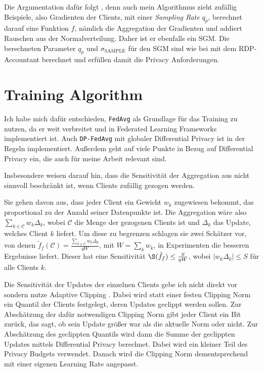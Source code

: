 Die Argumentation dafür folgt \textcite{boenisch:2023}, denn auch mein Algorithmus zieht zufällig Beispiele, also Gradienten der Clients, mit einer \textit{Sampling Rate} $q_p$, berechnet darauf eine Funktion $f$, nämlich die Aggregation der Gradienten und addiert Rauschen aus der Normalverteilung. Daher ist er ebenfalls ein SGM. Die berechneten Parameter $q_p$ und $\sigma_{\text{SAMPLE}}$ für den SGM sind wie bei \citeauthor{boenisch:2023} mit dem RDP-Accountant berechnet und erfüllen damit die Privacy Anforderungen.

\section{Training Algorithm}
Ich habe mich dafür entschieden, \texttt{FedAvg} als Grundlage für das Training zu nutzen, da er weit verbreitet und in Federated Learning Frameworks implementiert ist. Auch \texttt{DP-FedAvg} mit globaler Differential Privacy \cite{mcmahan:2018} ist in der Regeln implementiert. Außerdem geht \textcite{mcmahan:2018} auf viele Punkte in Bezug auf Differential Privacy ein, die auch für meine Arbeit relevant sind. 

Insbesondere weisen \citeauthor{mcmahan:2018} darauf hin, dass die Sensitivität der Aggregation aus nicht sinnvoll beschränkt ist, wenn Clients zufällig gezogen werden. 

Sie gehen davon aus, dass jeder Client ein Gewicht $w_k$ zugewiesen bekommt, das proportional zu der Anzahl seiner Datenpunkte ist. Die Aggregation wäre also $\sum_{k \in \mathcal{C}} w_k \Delta_k$, wobei $\mathcal{C}$ die Menge der gezogenen Clients ist und $\Delta_k$ das Update, welches Client $k$ liefert. Um diese zu begrenzen schlagen sie zwei Schätzer vor, von denen $\tilde{f}_f(\mathcal{C}) = \frac{\sum_{k \in \mathcal{C}} w_k \Delta_k}{qW}$, mit $W = \sum_k{w_k}$, in Experimenten die besseren Ergebnisse liefert. Dieser hat eine Sensitivität $\S(\tilde{f}_f) \leq \frac{S}{qW}$, wobei $|w_k \Delta_k| \leq S$ für alle Clients $k$.

Die Sensitivität der Updates der einzelnen Clients gebe ich nicht direkt vor sondern nutze Adaptive Clipping \cite{andrew:2021}. Dabei wird statt einer festen Clipping Norm ein Quantil der Clients festgelegt, deren Updates geclippt werden sollen. Zur Abschätzung der dafür notwendigen Clipping Norm gibt jeder Client ein Bit zurück, das sagt, ob sein Update größer war als die aktuelle Norm oder nicht. Zur Abschätzung des geclippten Quantils wird dann die Summe der geclippten Updates mittels Differential Privacy berechnet. Dabei wird ein kleiner Teil des Privacy Budgets verwendet. Danach wird die Clipping Norm dementsprechend mit einer eigenen Learning Rate angepasst. 

